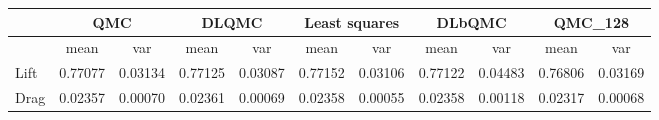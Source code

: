 \begin{tabular}{|l|c|c|c|c|c|c|c|c|c|c|}
\hline
 &\multicolumn{2}{c|}{\textbf{QMC}}&\multicolumn{2}{c|}{\textbf{DLQMC}}&\multicolumn{2}{c|}{\textbf{Least squares}}&\multicolumn{2}{c|}{\textbf{DLbQMC}}&\multicolumn{2}{c|}{\textbf{QMC\_128}}\\ 
\hline

 &mean&var&mean&var&mean&var&mean&var&mean&var\\ 
\hline
Lift &0.77077&0.03134&0.77125&0.03087&0.77152&0.03106&0.77122&0.04483&0.76806&0.03169\\ 
\hline
Drag &0.02357&0.00070&0.02361&0.00069&0.02358&0.00055&0.02358&0.00118&0.02317&0.00068\\ 
\hline
\end{tabular}

